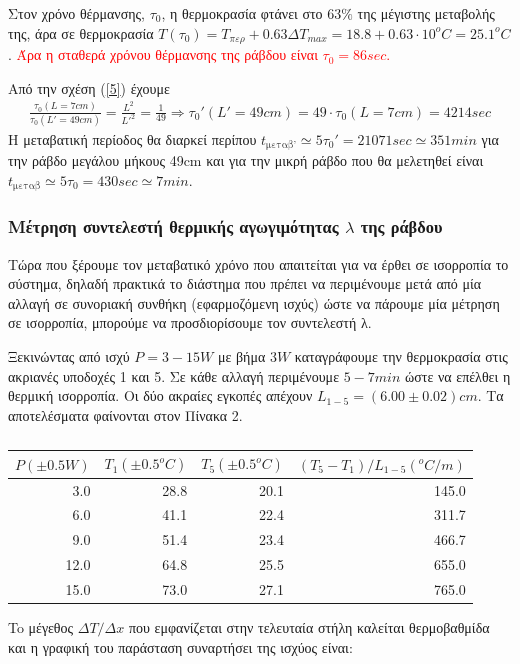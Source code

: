 \documentclass[a4paper]{article}
\begin{document}
Στον χρόνο θέρμανσης, $\tau_0$, η θερμοκρασία φτάνει στο $63\%$ της μέγιστης μεταβολής της, άρα σε θερμοκρασία  
$T(\tau_0) =T_{περ}+  0.63\Delta T_{max} = 18.8 + 0.63\cdot 10^oC = 25.1^oC$. \textcolor{red}{Άρα η σταθερά χρόνου θέρμανσης της ράβδου είναι $\tau_0 = 86sec$.}        %

Από την σχέση (\ref{5}) έχουμε 
\begin{align*}
\frac{\tau_{0}(L=7cm)}{\tau_0(L'=49cm)} =\frac{L^2}{L'^2} = \frac{1}{49} \Rightarrow \tau_0'(L'=49cm) = 49\cdot \tau_{0}(L=7cm) = 4214sec
\end{align*}
H μεταβατική περίοδος θα διαρκεί περίπου $t_{\text{μεταβ'}} \simeq 5 \tau_0' = 21071sec \simeq 351 min$ για την ράβδο μεγάλου μήκους 49cm και για την μικρή ράβδο που θα μελετηθεί είναι $t_{\text{μεταβ}} \simeq 5\tau_0 = 430sec \simeq 7min.$

\subsubsection*{Μέτρηση συντελεστή θερμικής αγωγιμότητας $\lambda$ της ράβδου}
Τώρα που ξέρουμε τον μεταβατικό χρόνο που απαιτείται για να έρθει σε ισορροπία το σύστημα, δηλαδή πρακτικά το διάστημα που πρέπει να περιμένουμε μετά από μία αλλαγή σε συνοριακή συνθήκη (εφαρμοζόμενη ισχύς) ώστε να πάρουμε μία μέτρηση σε ισορροπία, μπορούμε να προσδιορίσουμε τον συντελεστή λ.

Ξεκινώντας από ισχύ $P=3-15W$ με βήμα $3W$ καταγράφουμε την θερμοκρασία στις ακριανές υποδοχές 1 και 5. Σε κάθε αλλαγή περιμένουμε $5-7min$ ώστε να επέλθει η θερμική ισορροπία. Οι δύο ακραίες εγκοπές απέχουν $L_{1-5} = (6.00\pm0.02)cm$. Τα αποτελέσματα φαίνονται στον Πίνακα 2. 
\begin{table}[h!]
\centering
\caption{ }
\begin{tabular}{r|r|r|r}
$P(\pm0.5W)$ & $T_1(\pm0.5^oC)$ & $T_5(\pm0.5^oC)$ & $(T_5-T_1)/L_{1-5}(^oC/m)$\\ 
\hline\hline
3.0&28.8&20.1  &145.0\\
 6.0&41.1&22.4  &311.7\\
 9.0&51.4&23.4  &466.7\\
12.0&64.8&25.5  &655.0\\
15.0&73.0&27.1  &765.0
\end{tabular}
\end{table}

To μέγεθος $\Delta T /\Delta x$ που εμφανίζεται στην τελευταία στήλη καλείται θερμοβαθμίδα και η γραφική του παράσταση συναρτήσει της ισχύος είναι:
\end{document}
